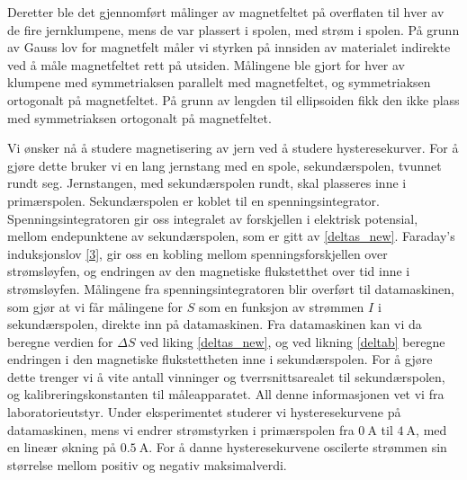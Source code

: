 \documentclass[%
 reprint,
nofootinbib,
aps,
]{revtex4-1}
\begin{document}
Deretter ble det gjennomført målinger av magnetfeltet på overflaten til hver av de fire jernklumpene, mens de var plassert i spolen, med strøm i spolen. På grunn av Gauss lov for magnetfelt måler vi styrken på innsiden av materialet indirekte ved å måle magnetfeltet rett på utsiden. Målingene ble gjort for hver av klumpene med symmetriaksen parallelt med magnetfeltet, og symmetriaksen ortogonalt på magnetfeltet. På grunn av lengden til ellipsoiden fikk den ikke plass med symmetriaksen ortogonalt på magnetfeltet.
\par
Vi ønsker nå å studere magnetisering av jern ved å studere hysteresekurver. For å gjøre dette bruker vi en lang jernstang med en spole, sekundærspolen, tvunnet rundt seg. Jernstangen, med sekundærspolen rundt, skal plasseres inne i primærspolen. Sekundærspolen er koblet til en spenningsintegrator. Spenningsintegratoren gir oss integralet av forskjellen i elektrisk potensial, mellom endepunktene av sekundærspolen, som er gitt av \eqref{deltas_new}. Faraday's induksjonslov \eqref{3}, gir oss en kobling mellom spenningsforskjellen over strømsløyfen, og endringen av den magnetiske flukstetthet over tid inne i strømsløyfen. Målingene fra spenningsintegratoren blir overført til datamaskinen, som gjør at vi får målingene for $S$ som en funksjon av strømmen $I$ i sekundærspolen, direkte inn på datamaskinen. Fra datamaskinen kan vi da beregne verdien for $\Delta S$ ved liking \eqref{deltas_new}, og ved likning \eqref{deltab} beregne endringen i den magnetiske flukstettheten inne i sekundærspolen. For å gjøre dette trenger vi å vite antall vinninger og tverrsnittsarealet til sekundærspolen, og kalibreringskonstanten til måleapparatet. All denne informasjonen vet vi fra laboratorieutstyr. Under eksperimentet studerer vi hysteresekurvene på datamaskinen, mens vi endrer strømstyrken i primærspolen fra $\SI{0}{\ampere}$ til $\SI{4}{\ampere}$, med en lineær økning på $\SI{0.5}{\ampere}$. For å danne hysteresekurvene oscilerte strømmen sin størrelse mellom positiv og negativ maksimalverdi.
\end{document}
